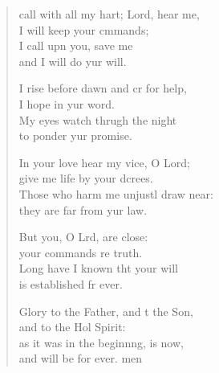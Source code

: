 \settowidth{\versewidth}{I call with all my heart; Lord, hear me, *}
\begin{verse}%
  \begin{patverse}
     call with all my hart; Lord, hear me,\Med\\
I will keep your cmmands;\\
I call upn you, save me\Med\\
and I will do yur will.

I rise before dawn and cr for help,\Med\\
I hope in yur word.\\
My eyes watch thrugh the night\Med\\
to ponder yur promise.

In your love hear my vice, O Lord;\Med\\
give me life by your dcrees.\\
Those who harm me unjustl draw near:\Med\\
they are far from yur law.

But you, O Lrd, are close:\Med\\
your commands re truth.\\
Long have I known tht your will\Med\\
is established fr ever.

Glory to the Father, and t the Son,\Med\\
and to the Hol Spirit:\\
as it was in the beginn\pointup{\i}ng, is now,\Med\\
and will be for ever. men
  \end{patverse}
\end{verse}
